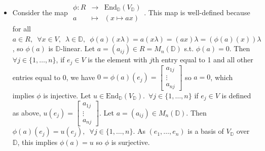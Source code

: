 \documentclass[12pt,letterpaper]{report}
\begin{document}
\begin{itemize}
\item Consider the map $\begin{array}{rrr}\phi:R&\rightarrow&\text{End}_{\mathbb{D}}(V_{\mathbb{D}})\\a&\mapsto&(x\mapsto ax)\end{array}$. This map is well-defined because for all $a\in R,\,\,\,\forall x\in V,\,\,\,\lambda\in\mathbb{D},\,\,\,\phi(a)(x\lambda)=a(x\lambda)=(ax)\lambda=(\phi(a)(x))\lambda$, so $\phi(a)$ is $\mathbb{D}$-linear. Let $a=(a_{ij})\in R=M_{n}(\mathbb{D})$ s.t. $\phi(a)=0$. Then $\forall j\in\{1,\dots,n\}$, if $e_{j}\in V$ is the element with $j$th entry equal to 1 and all other entries equal to 0, we have $0=\phi(a)(e_{j})=\begin{bmatrix}a_{1j}\\\vdots\\a_{nj}\end{bmatrix}$ so $a=0$, which implies $\phi$ is injective. Let $u\in \text{End}_{\mathbb{D}}(V_{\mathbb{D}}).\,\,\,\forall j\in\{1,\dots,n\}$ if $e_{j}\in V$ is defined as above, $u(e_{j})=\begin{bmatrix}a_{1j}\\\vdots\\a_{nj}\end{bmatrix}. $ Let $a=(a_{ij})\in M_{n}(\mathbb{D})$. Then $\phi(a)(e_{j})=u(e_{j}),\,\,\,\forall j\in\{1,\dots,n\}$. As $(e_{1},\dots,e_{n})$ is a basis of $V_{\mathbb{D}}$ over $\mathbb{D}$, this implies $\phi(a)=u$ so $\phi$ is surjective.

\end{itemize}
\end{document}
